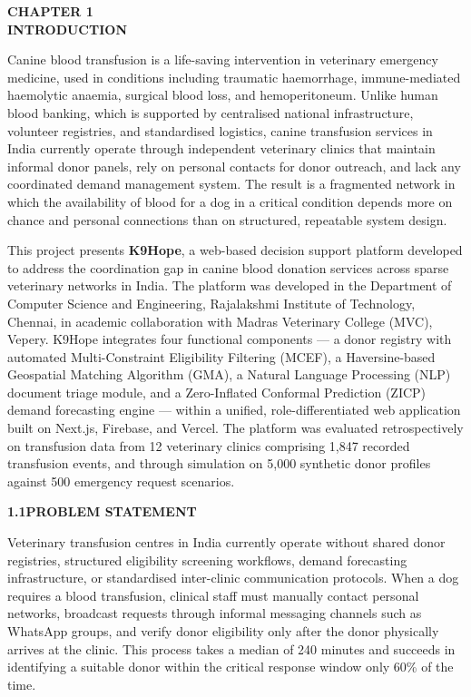 \documentclass[12pt,a4paper]{article}
\begin{document}
\begin{center}
    \textbf{\large CHAPTER 1}\\[0.4em]
    \textbf{\large INTRODUCTION}
\end{center}
\vspace{1.5em}

\noindent Canine blood transfusion is a life-saving intervention in veterinary emergency medicine, used in conditions including traumatic haemorrhage, immune-mediated haemolytic anaemia, surgical blood loss, and hemoperitoneum. Unlike human blood banking, which is supported by centralised national infrastructure, volunteer registries, and standardised logistics, canine transfusion services in India currently operate through independent veterinary clinics that maintain informal donor panels, rely on personal contacts for donor outreach, and lack any coordinated demand management system. The result is a fragmented network in which the availability of blood for a dog in a critical condition depends more on chance and personal connections than on structured, repeatable system design.

\noindent This project presents \textbf{K9Hope}, a web-based decision support platform developed to address the coordination gap in canine blood donation services across sparse veterinary networks in India. The platform was developed in the Department of Computer Science and Engineering, Rajalakshmi Institute of Technology, Chennai, in academic collaboration with Madras Veterinary College (MVC), Vepery. K9Hope integrates four functional components — a donor registry with automated Multi-Constraint Eligibility Filtering (MCEF), a Haversine-based Geospatial Matching Algorithm (GMA), a Natural Language Processing (NLP) document triage module, and a Zero-Inflated Conformal Prediction (ZICP) demand forecasting engine — within a unified, role-differentiated web application built on Next.js, Firebase, and Vercel. The platform was evaluated retrospectively on transfusion data from 12 veterinary clinics comprising 1,847 recorded transfusion events, and through simulation on 5,000 synthetic donor profiles against 500 emergency request scenarios.

\vspace{2em}
\noindent\textbf{1.1\quad PROBLEM STATEMENT}
\vspace{0.8em}

\noindent Veterinary transfusion centres in India currently operate without shared donor registries, structured eligibility screening workflows, demand forecasting infrastructure, or standardised inter-clinic communication protocols. When a dog requires a blood transfusion, clinical staff must manually contact personal networks, broadcast requests through informal messaging channels such as WhatsApp groups, and verify donor eligibility only after the donor physically arrives at the clinic. This process takes a median of 240 minutes and succeeds in identifying a suitable donor within the critical response window only 60\% of the time.
\end{document}
